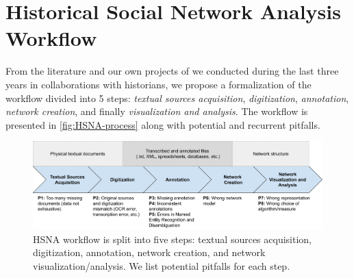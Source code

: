 

\section{Historical Social Network Analysis Workflow}


From the literature and our own projects of \hsna we conducted during the last three years in collaborations with historians, we propose a formalization of the \hsna workflow divided into 5 steps: \textit{textual sources acquisition}, \textit{digitization}, \textit{annotation}, \textit{network creation}, and finally \textit{visualization and analysis}.
The workflow is presented in \autoref{fig:HSNA-process} along with potential and recurrent pitfalls.

\begin{figure}
    \includegraphics[origin=c, width=\textwidth]{static/figures/HSNAProcess/process.pdf}
    \caption{HSNA workflow is split into five steps: textual sources acquisition, digitization, annotation, network creation, and network visualization/analysis. We list potential pitfalls for each step.}
    \label{fig:HSNA-process}
\end{figure}


